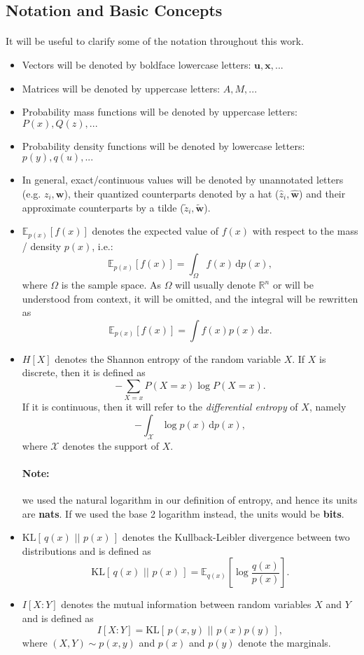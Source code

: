 \documentclass{article}
\renewcommand{\vec}[1]{\mathbf{#1}}
\renewcommand{\d}{\,\text{d}}
\newcommand{\X}{\mathcal{X}}
\newcommand{\KL}[2]{\mathrm{KL}[\,#1\,\,||\,\,#2\,]}
\newcommand{\Exp}{\mathbb{E}}
\newcommand{\Reals}{\mathbb{R}}
\begin{document}
\subsection{Notation and Basic Concepts}
\paragraph{}
It will be useful to clarify some of the notation throughout this work.
\begin{itemize}
\item Vectors will be denoted by boldface lowercase letters: $\vec{u}, \vec{x}, ...$
\item Matrices will be denoted by uppercase letters: $A, M, ...$
\item Probability mass functions will be denoted by uppercase letters: $P(x),
  Q(z), ...$
\item Probability density functions will be denoted by lowercase letters: $p(y),
  q(u), ...$
\item In general, exact/continuous values will be denoted by unannotated letters
  (e.g. $z_i, \vec{w}$), their quantized counterparts denoted by a hat
  ($\hat{z}_i, \vec{\hat{w}}$) and their approximate counterparts by a tilde
  ($\tilde{z}_i, \vec{\tilde{w}}$).
\item $\Exp_{p(x)}[f(x)]$ denotes the expected value of $f(x)$ with respect to
  the mass / density $p(x)$, i.e.:
  \[
    \Exp_{p(x)}[f(x)] = \int_\Omega f(x) \d p(x),
  \]
  where $\Omega$ is the sample space. As $\Omega$ will usually denote $\Reals^n$
  or will be understood from context, it will be omitted, and the integral will
  be rewritten as
  \[
    \Exp_{p(x)}[f(x)] = \int f(x)p(x) \d x.
  \]
\item $H[X]$ denotes the Shannon entropy of the random variable $X$. If $X$ is
  discrete, then it is defined as
  \[
    -\sum_{X=x}P(X=x)\log P(X=x).
  \]
  If it is continuous, then it will refer to the \textit{differential entropy}
  of $X$, namely
  \[
    -\int_{\X}\log p(x) \d p(x),
  \]
  where $\X$ denotes the support of $X$.
  \paragraph{Note:} we used the natural logarithm in our definition of entropy,
  and hence its units are \textbf{nats}. If we used the base 2 logarithm
  instead, the units would be \textbf{bits}.
\item $\KL{q(x)}{p(x)}$ denotes the Kullback-Leibler divergence between two
  distributions and is defined as
  \[
    \KL{q(x)}{p(x)} = \Exp_{q(x)}\left[\log\frac{q(x)}{p(x)}\right].
  \]
\item $I[X : Y]$ denotes the mutual information between random variables $X$ and
  $Y$ and is defined as
  \[
    I[X : Y] = \KL{p(x, y)}{p(x)p(y)},
  \]
  where $(X, Y) \sim p(x, y)$ and $p(x)$ and $p(y)$ denote the marginals.
\end{itemize}
\end{document}
